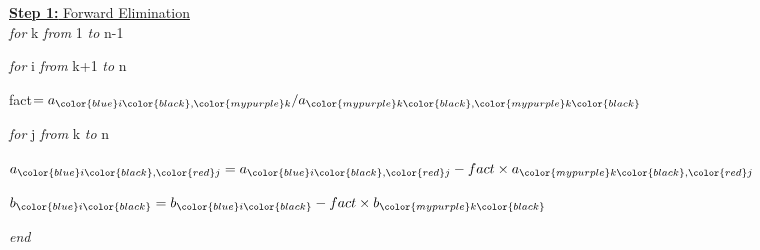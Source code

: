 \documentclass[fleqn]{beamer} %
\newcommand{\sectionIVsubsectionIIItitle}{}
\begin{document}
			\begin{frame}
				\frametitle{\sectionIVsubsectionIIItitle}
				\bigskip

				\begin{multicols}{2}
				\underline{{\bf Step 1:} Forward Elimination} \vspace{2mm}\\ 

		{\it for} \color{mypurple}k \color{black} {\it from} 1 {\it to} \color{mygreen}n\color{black}-1 \vspace{1mm}
	
		\hspace{3mm} {\it for} \color{blue}i \color{black} {\it from} \color{mypurple}k\color{black}+1 {\it to} \color{mygreen}n\color{black} \vspace{1mm}
		
		\hspace{6mm} fact$=a_{\color{blue}i\color{black},\color{mypurple}k}/a_{\color{mypurple}k\color{black},\color{mypurple}k\color{black}}$ \vspace{1mm}

		\hspace{9mm} {\it for} \color{red}j \color{black} {\it from} \color{mypurple} k \color{black}  {\it to} \color{mygreen}n\color{black} \vspace{1mm}

		\hspace{12mm} $a_{\color{blue}i\color{black},\color{red}j}=a_{\color{blue}i\color{black},\color{red}j}-fact\times a_{\color{mypurple}k\color{black},\color{red}j}$ \vspace{1mm}
		
\hspace{10mm}{\it end} \vspace{1mm}

\hspace*{9mm}$b_{\color{blue}i\color{black}}=b_{\color{blue}i\color{black}}-fact\times b_{\color{mypurple}k\color{black}}$ \vspace{1mm}

\hspace*{6mm}{\it end} \vspace{1mm}

{\it end}\vspace{15mm}
		

\end{multicols}
\end{frame}
\end{document}
